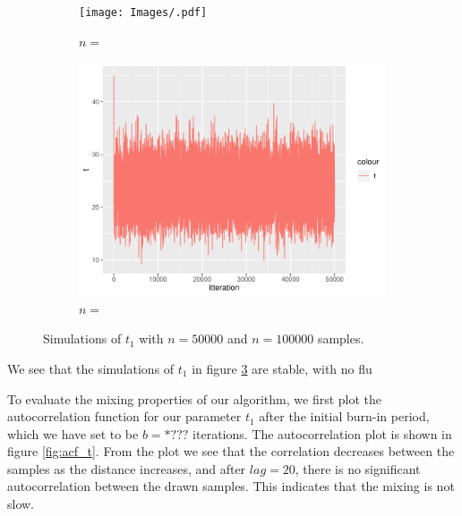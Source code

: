 \begin{figure}[h]
\begin{subfigure}[b]{0.49\textwidth}
        \centering
        \texttt{[image: Images/.pdf]}
        \caption{$n =$ }
        \label{fig:}
    \end{subfigure}
    \begin{subfigure}[b]{0.49\textwidth}
        \centering
        \includegraphics[width = \textwidth]{Images/sim_t_50000.pdf}
        \caption{$n =$ }
        \label{fig:}
    \end{subfigure}
    \caption{Simulations of $t_1$ with $n = 50000$ and $n=100000$ samples. }
    \label{fig:sim_t_big_n}
\end{figure}

We see that the simulations of $t_1$ in figure \ref{fig:sim_t_big_n} are stable, with no flu




To evaluate the mixing properties of our algorithm, we first plot the autocorrelation function for our parameter $t_1$ after the initial burn-in period, which we have set to be $b = *???$ iterations. The autocorrelation plot is shown in figure \ref{fig:acf_t}. From the plot we see that the correlation decreases between the samples as the distance increases, and after $lag = 20$, there is no significant autocorrelation between the drawn samples. This indicates that the mixing is not slow. 

